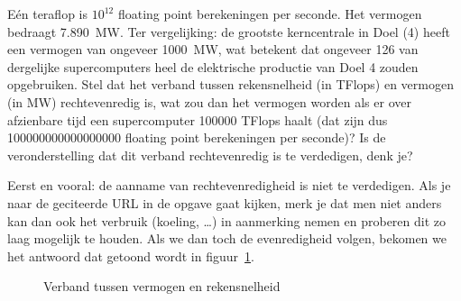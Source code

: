 \begin{oef}
Eén teraflop is $10^{12}$ floating point berekeningen per seconde. Het vermogen bedraagt \SI{7,890}{\mega\watt}. Ter vergelijking: de grootste kerncentrale in Doel (4) heeft een vermogen van ongeveer \SI{1000}{\mega\watt}, wat betekent dat ongeveer 126 van dergelijke supercomputers heel de elektrische productie van Doel 4 zouden opgebruiken. Stel dat het verband tussen rekensnelheid (in TFlops) en vermogen (in \si{\mega\watt}) rechtevenredig is, wat zou dan het vermogen worden als er over afzienbare  tijd een supercomputer \num{100000} TFlops haalt (dat zijn dus \num{100000000000000000} floating point berekeningen per seconde)? Is de veronderstelling dat dit verband rechtevenredig is te verdedigen, denk je?
\begin{opl}
Eerst en vooral: de aanname van rechtevenredigheid is niet te verdedigen. Als je naar de geciteerde URL in de opgave gaat kijken, merk je dat men niet anders kan dan ook het verbruik (koeling, \ldots) in aanmerking nemen en proberen dit zo laag mogelijk te houden. Als we dan toch de evenredigheid volgen, bekomen we het antwoord dat getoond wordt in figuur~\ref{fig:rekensnelheidvermogen}.
\begin{figure}[htbp]
    \centering
{}
\caption{Verband tussen vermogen en rekensnelheid}
    \label{fig:rekensnelheidvermogen}
\end{figure}
\end{opl}
\end{oef}

